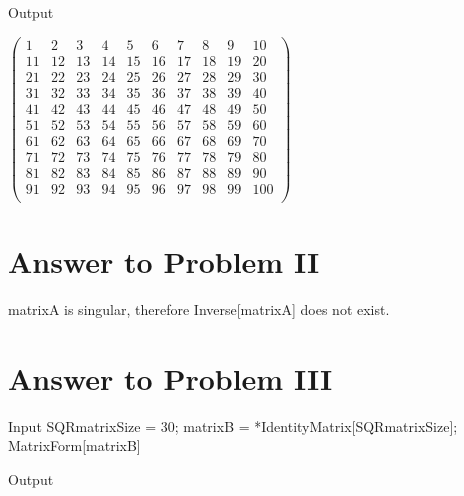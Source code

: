 \documentclass[11pt,a4paper]{article}
\begin{document}
\begin{mmaCell}{Output}

\end{mmaCell}

\begin{doublespace}
\noindent\(\left(
\begin{array}{cccccccccc}
 1 & 2 & 3 & 4 & 5 & 6 & 7 & 8 & 9 & 10 \\
 11 & 12 & 13 & 14 & 15 & 16 & 17 & 18 & 19 & 20 \\
 21 & 22 & 23 & 24 & 25 & 26 & 27 & 28 & 29 & 30 \\
 31 & 32 & 33 & 34 & 35 & 36 & 37 & 38 & 39 & 40 \\
 41 & 42 & 43 & 44 & 45 & 46 & 47 & 48 & 49 & 50 \\
 51 & 52 & 53 & 54 & 55 & 56 & 57 & 58 & 59 & 60 \\
 61 & 62 & 63 & 64 & 65 & 66 & 67 & 68 & 69 & 70 \\
 71 & 72 & 73 & 74 & 75 & 76 & 77 & 78 & 79 & 80 \\
 81 & 82 & 83 & 84 & 85 & 86 & 87 & 88 & 89 & 90 \\
 91 & 92 & 93 & 94 & 95 & 96 & 97 & 98 & 99 & 100 \\
\end{array}
\right)\)
\end{doublespace}

\section{Answer to Problem II}\label{sec:P02}

matrixA is singular, therefore Inverse[matrixA] does not exist.

\clearpage
\section{Answer to Problem III}\label{sec:P03}

\begin{mmaCell}[moredefined={SQRmatrixSize, matrixB}]{Input}
SQRmatrixSize = 30;
matrixB = \mmaDef{\(\pmb{\pi}\)}*IdentityMatrix[SQRmatrixSize];
MatrixForm[matrixB]
\end{mmaCell}

\begin{mmaCell}{Output}

\end{mmaCell}
\end{document}
